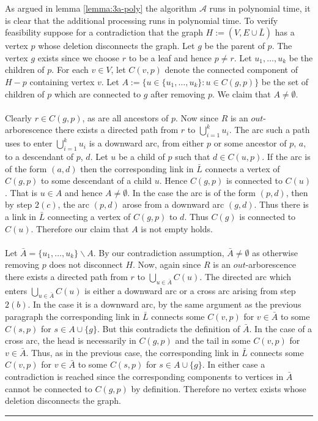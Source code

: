 \documentclass[letterpaper,12pt,oneside,onecolumn]{article}
\newcommand{\cA}{\mathcal{A}} \newcommand{\cB}{\mathcal{B}}
\newenvironment{proof}{{\bf Proof:  }}{\hfill\rule{2mm}{2mm}}
\begin{document}
\begin{proof}
As argued in lemma \ref{lemma:3a-poly} the algorithm $\cA$ runs in polynomial time, it is clear that the additional processing runs in polynomial time. To verify feasibility suppose for a contradiction that the graph $H := (V, E \cup \bar{L})$ has a vertex $p$ whose deletion disconnects the graph. Let $g$ be the parent of $p$. The vertex $g$ exists since we choose $r$ to be a leaf and hence $p \neq r$. Let $u_1, \dots, u_k$ be the children of $p$. For each $v \in V$, let $C(v,p)$ denote the connected component of $H-p$ containing vertex $v$. Let $A := \{u \in \{u_1, \dots, u_k\} : u \in C(g,p)\}$ be the set of children of $p$ which are connected to $g$ after removing $p$. We claim that $A \neq \emptyset$.
\paragraph{}
Clearly $r \in C(g,p)$, as are all ancestors of $p$. Now since $R$ is an $out$-arborescence there exists a directed path from $r$ to $\bigcup_{i=1}^k u_i$. The arc such a path uses to enter $\bigcup_{i=1}^k u_i$ is a downward arc, from either $p$ or  some ancestor of $p$, $a$, to a descendant of $p$, $d$. Let $u$ be a child of $p$ such that $d \in C(u,p)$. If the arc is of the form $(a,d)$ then the corresponding link  in $\bar{L}$ connects a vertex of $C(g,p)$ to some descendant of a child $u$. Hence $C(g,p)$ is connected to $C(u)$. That is $u \in A$ and hence $A \neq \emptyset$. In the case the arc is of the form $(p,d)$, then by step $2(c)$, the arc $(p,d)$ arose from a downward arc $(g,d)$. Thus there is a link in $\bar{L}$ connecting a vertex of $C(g,p)$ to $d$. Thus $C(g)$ is connected to $C(u)$. Therefore our claim that $A$ is not empty holds.
\paragraph{}
 Let $\bar{A} = \{u_1, \dots, u_k\} \backslash A$. By our contradiction assumption, $\bar{A}\neq \emptyset$ as otherwise removing $p$ does not disconnect $H$. Now, again since $R$ is an $out$-arborescence there exists a directed path from $r$ to $\bigcup_{u \in \bar{A}} C(u)$. The directed arc which enters $\bigcup_{u \in \bar{A}} C(u)$ is either a downward arc or a cross arc arising from step $2(b)$. In the case it is a downward arc, by the same argument as the previous paragraph the corresponding link in $\bar{L}$ connects some $C(v, p)$ for $v \in \bar{A}$ to some $C(s,p)$ for $s \in A \cup \{g\}$. But this contradicts the definition of $\bar{A}$. In the case of a cross arc, the head is necessarily in $C(g,p)$ and the tail in some $C(v,p)$ for $v \in \bar{A}$. Thus, as in the previous case, the corresponding link in $\bar{L}$ connects some $C(v, p)$ for $v \in \bar{A}$ to some $C(s,p)$ for $s \in A \cup \{g\}$. In either case a contradiction is reached since the corresponding components to vertices in $\bar{A}$ cannot be connected to $C(g,p)$ by definition. Therefore no vertex exists whose deletion disconnects the graph.
\end{proof}
\end{document}

